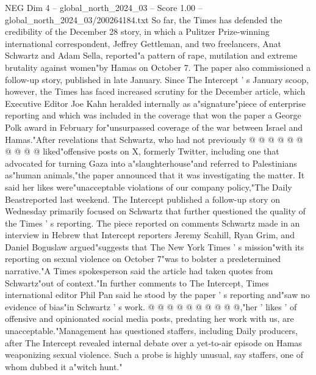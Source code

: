 \begin{textsample}{NEG Dim 4 – global\_north\_2024\_03 – Score 1.00 – global\_north\_2024\_03/200264184.txt}
So far, the Times has defended the credibility of the December 28 story, in which a Pulitzer Prize-winning international correspondent, Jeffrey Gettleman, and two freelancers, Anat Schwartz and Adam Sella, reported"a pattern of rape, mutilation and extreme brutality against women"by Hamas on October 7.
The paper also commissioned a follow-up story, published in late January.
Since The Intercept ' s January scoop, however, the Times has faced increased scrutiny for the December article, which Executive Editor Joe Kahn heralded internally as a"signature"piece of enterprise reporting and which was included in the coverage that won the paper a George Polk award in February for"unsurpassed coverage of the war between Israel and Hamas."After revelations that Schwartz, who had not previously @ @ @ @ @ @ @ @ @ @ liked"offensive posts on X, formerly Twitter, including one that advocated for turning Gaza into a"slaughterhouse"and referred to Palestinians as"human animals,"the paper announced that it was investigating the matter.
It said her likes were"unacceptable violations of our company policy,"The Daily Beastreported last weekend.
The Intercept published a follow-up story on Wednesday primarily focused on Schwartz that further questioned the quality of the Times ' s reporting.
The piece reported on comments Schwartz made in an interview in Hebrew that Intercept reporters Jeremy Scahill, Ryan Grim, and Daniel Boguslaw argued"suggests that The New York Times ' s mission"with its reporting on sexual violence on October 7"was to bolster a predetermined narrative."A Times spokesperson said the article had taken quotes from Schwartz"out of context."In further comments to The Intercept, Times international editor Phil Pan said he stood by the paper ' s reporting and"saw no evidence of bias"in Schwartz ' s work. @ @ @ @ @ @ @ @ @ @,"her ' likes ' of offensive and opinionated social media posts, predating her work with us, are unacceptable."Management has questioned staffers, including Daily producers, after The Intercept revealed internal debate over a yet-to-air episode on Hamas weaponizing sexual violence.
Such a probe is highly unusual, say staffers, one of whom dubbed it a"witch hunt."

\end{textsample}
